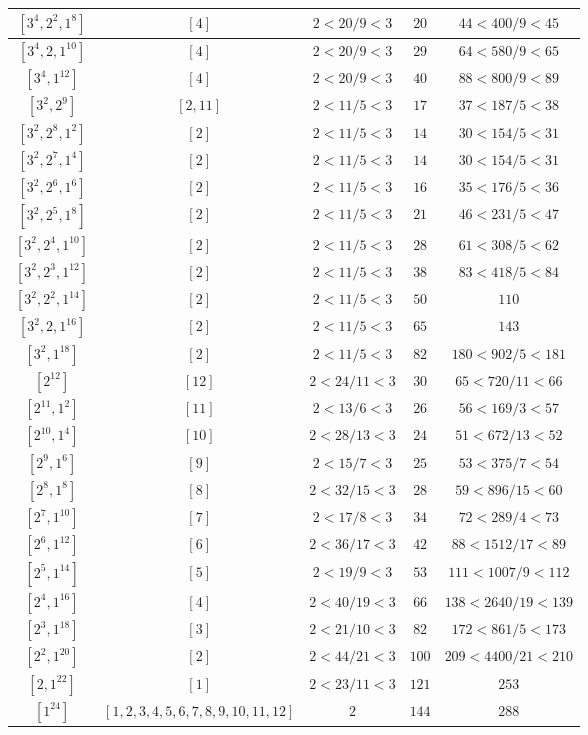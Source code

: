 \documentclass{article}%
\begin{document}
\begin{center}
\begin{longtable}{||c|c|c|c|c||}
$[3^{4}, 2^{2}, 1^{8}]$ & $[4]$ & $2 < 20/9 < 3$ & $20$ & $44 < 400/9 < 45$ \\ \hline 
$[3^{4}, 2, 1^{10}]$ & $[4]$ & $2 < 20/9 < 3$ & $29$ & $64 < 580/9 < 65$ \\ \hline 
$[3^{4}, 1^{12}]$ & $[4]$ & $2 < 20/9 < 3$ & $40$ & $88 < 800/9 < 89$ \\ \hline 
$[3^{2}, 2^{9}]$ & $[2, 11]$ & $2 < 11/5 < 3$ & $17$ & $37 < 187/5 < 38$ \\ \hline 
$[3^{2}, 2^{8}, 1^{2}]$ & $[2]$ & $2 < 11/5 < 3$ & $14$ & $30 < 154/5 < 31$ \\ \hline 
$[3^{2}, 2^{7}, 1^{4}]$ & $[2]$ & $2 < 11/5 < 3$ & $14$ & $30 < 154/5 < 31$ \\ \hline 
$[3^{2}, 2^{6}, 1^{6}]$ & $[2]$ & $2 < 11/5 < 3$ & $16$ & $35 < 176/5 < 36$ \\ \hline 
$[3^{2}, 2^{5}, 1^{8}]$ & $[2]$ & $2 < 11/5 < 3$ & $21$ & $46 < 231/5 < 47$ \\ \hline 
$[3^{2}, 2^{4}, 1^{10}]$ & $[2]$ & $2 < 11/5 < 3$ & $28$ & $61 < 308/5 < 62$ \\ \hline 
$[3^{2}, 2^{3}, 1^{12}]$ & $[2]$ & $2 < 11/5 < 3$ & $38$ & $83 < 418/5 < 84$ \\ \hline 
$[3^{2}, 2^{2}, 1^{14}]$ & $[2]$ & $2 < 11/5 < 3$ & $50$ & $110$ \\ \hline 
$[3^{2}, 2, 1^{16}]$ & $[2]$ & $2 < 11/5 < 3$ & $65$ & $143$ \\ \hline 
$[3^{2}, 1^{18}]$ & $[2]$ & $2 < 11/5 < 3$ & $82$ & $180 < 902/5 < 181$ \\ \hline 
$[2^{12}]$ & $[12]$ & $2 < 24/11 < 3$ & $30$ & $65 < 720/11 < 66$ \\ \hline 
$[2^{11}, 1^{2}]$ & $[11]$ & $2 < 13/6 < 3$ & $26$ & $56 < 169/3 < 57$ \\ \hline 
$[2^{10}, 1^{4}]$ & $[10]$ & $2 < 28/13 < 3$ & $24$ & $51 < 672/13 < 52$ \\ \hline 
$[2^{9}, 1^{6}]$ & $[9]$ & $2 < 15/7 < 3$ & $25$ & $53 < 375/7 < 54$ \\ \hline 
$[2^{8}, 1^{8}]$ & $[8]$ & $2 < 32/15 < 3$ & $28$ & $59 < 896/15 < 60$ \\ \hline 
$[2^{7}, 1^{10}]$ & $[7]$ & $2 < 17/8 < 3$ & $34$ & $72 < 289/4 < 73$ \\ \hline 
$[2^{6}, 1^{12}]$ & $[6]$ & $2 < 36/17 < 3$ & $42$ & $88 < 1512/17 < 89$ \\ \hline 
$[2^{5}, 1^{14}]$ & $[5]$ & $2 < 19/9 < 3$ & $53$ & $111 < 1007/9 < 112$ \\ \hline 
$[2^{4}, 1^{16}]$ & $[4]$ & $2 < 40/19 < 3$ & $66$ & $138 < 2640/19 < 139$ \\ \hline 
$[2^{3}, 1^{18}]$ & $[3]$ & $2 < 21/10 < 3$ & $82$ & $172 < 861/5 < 173$ \\ \hline 
$[2^{2}, 1^{20}]$ & $[2]$ & $2 < 44/21 < 3$ & $100$ & $209 < 4400/21 < 210$ \\ \hline 
$[2, 1^{22}]$ & $[1]$ & $2 < 23/11 < 3$ & $121$ & $253$ \\ \hline 
$[1^{24}]$ & $[1, 2, 3, 4, 5, 6, 7, 8, 9, 10, 11, 12]$ & $2$ & $144$ & $288$ \\ \hline 
    \end{longtable}
    \end{center}
\end{document}
